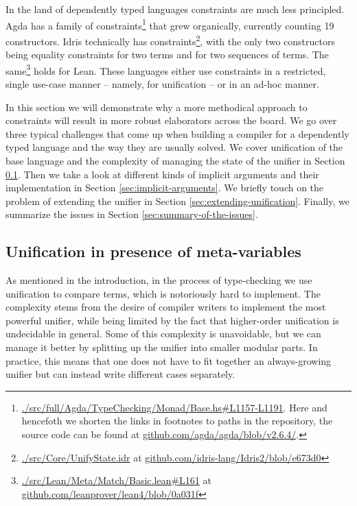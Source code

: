 \documentclass[
  sigconf,
  screen,
  review]{acmart}
\begin{document}
In the land of dependently typed languages constraints are much less
principled. Agda has a family of constraints\footnote{\href{https://github.com/agda/agda/blob/v2.6.4/src/full/Agda/TypeChecking/Monad/Base.hs\#L1157-L1191}{./src/full/Agda/TypeChecking/Monad/Base.hs\#L1157-L1191}.
  Here and hencefoth we shorten the links in footnotes to paths in the
  repository, the source code can be found at
  \href{https://github.com/agda/agda/blob/v2.6.4/}{github.com/agda/agda/blob/v2.6.4/}.}
that grew organically, currently counting 19 constructors. Idris
technically has constraints\footnote{\href{https://github.com/idris-lang/Idris2/blob/e673d05a67b82591131e35ccd50fc234fb9aed85/src/Core/UnifyState.idr}{./src/Core/UnifyState.idr}
  at
  \href{https://github.com/idris-lang/Idris2/blob/e673d05a67b82591131e35ccd50fc234fb9aed85}{github.com/idris-lang/Idris2/blob/e673d0}},
with the only two constructors being equality constraints for two terms
and for two sequences of terms. The same\footnote{\href{https://github.com/leanprover/lean4/blob/0a031fc9bbb43c274bb400f121b13711e803f56c/src/Lean/Meta/Match/Basic.lean\#L161}{./src/Lean/Meta/Match/Basic.lean\#L161}
  at
  \href{https://github.com/leanprover/lean4/blob/0a031fc9bbb43c274bb400f121b13711e803f56c/}{github.com/leanprover/lean4/blob/0a031f}}
holds for Lean. These languages either use constraints in a restricted,
single use-case manner -- namely, for unification -- or in an ad-hoc
manner.

In this section we will demonstrate why a more methodical approach to
constraints will result in more robust elaborators across the board. We
go over three typical challenges that come up when building a compiler
for a dependently typed language and the way they are usually solved. We
cover unification of the base language and the complexity of managing
the state of the unifier in Section \ref{sec:conversion_checking}. Then
we take a look at different kinds of implicit arguments and their
implementation in Section \ref{sec:implicit-arguments}. We briefly touch
on the problem of extending the unifier in Section
\ref{sec:extending-unification}. Finally, we summarize the issues in
Section \ref{sec:summary-of-the-issues}.

\hypertarget{sec:conversion_checking}{%
\subsection{Unification in presence of
meta-variables}\label{sec:conversion_checking}}

As mentioned in the introduction, in the process of type-checking we use
unification to compare terms, which is notoriously hard to implement.
The complexity stems from the desire of compiler writers to implement
the most powerful unifier, while being limited by the fact that
higher-order unification is undecidable in general. Some of this
complexity is unavoidable, but we can manage it better by splitting up
the unifier into smaller modular parts. In practice, this means that one
does not have to fit together an always-growing unifier but can instead
write different cases separately.
\end{document}
